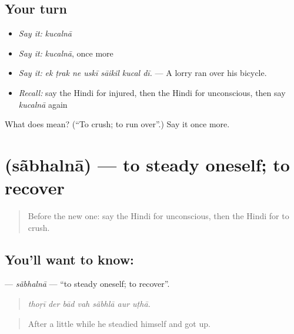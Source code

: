 \subsection*{Your turn}
\begin{itemize}
\raggedright
  \item \emph{Say it:} \emph{kucalnā}
  \item \emph{Say it:} \emph{kucalnā}, once more
  \item \emph{Say it:} \emph{ek ṭrak ne uskī sāikil kucal dī.} — A lorry ran over his bicycle.
  \item \emph{Recall:} say the Hindi for injured, then the Hindi for unconscious, then say \emph{kucalnā} again
\end{itemize}

\begin{tcolorbox}[breakable,colback=teal!4,colframe=teal!35!black,title={Before you move on}]
What does  mean? (\textquotedblleft{}To crush; to run over\textquotedblright{}.) Say it once more.
\end{tcolorbox}
\section[\texorpdfstring{\hi{सँभलना} (sãbhalnā)}{सँभलना (sãbhalnā)}]{ (sãbhalnā) — to steady oneself; to recover}

\label{lesson:HI-C298-sambhalna}



\begin{quote}
Before the new one: say the Hindi for unconscious, then the Hindi for to crush.
\end{quote}

\subsection*{You'll want to know: }
\textbf{} — \emph{sãbhalnā} — \textquotedblleft{}to steady oneself; to recover\textquotedblright{}.

\begin{quote}
      
\end{quote}

\begin{quote}
\emph{thoṛī der bād vah sãbhlā aur uṭhā.}
\end{quote}

\begin{quote}
After a little while he steadied himself and got up.
\end{quote}


